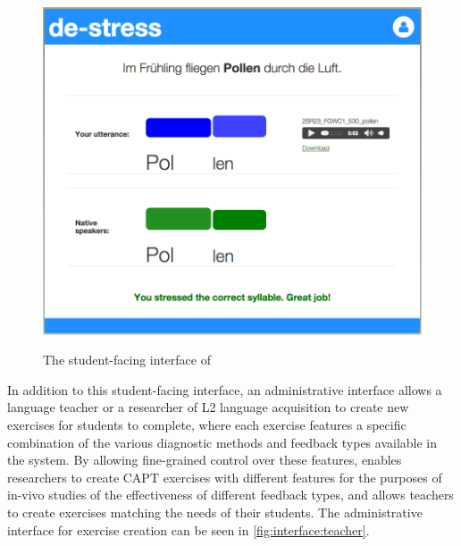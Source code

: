 	\begin{figure}[htb]
		\centering
		\caption{The student-facing interface of }
		\includegraphics[width=\textwidth]{img/screenshots/StudentInterface-userIcon}
		\label{fig:interface:student}
	\end{figure}

In addition to this student-facing interface, 
an administrative interface allows
a language teacher or a researcher of L2 language acquisition 
to
create new exercises for students to complete, where each exercise features a specific combination of the various diagnostic methods and feedback types available in the system. By allowing fine-grained control over these features,  enables researchers to create CAPT exercises with different features for the purposes of in-vivo studies of the effectiveness of different feedback types, and allows teachers to create exercises matching the needs of their students. The 
administrative interface for exercise creation can be seen in \cref{fig:interface:teacher}.

